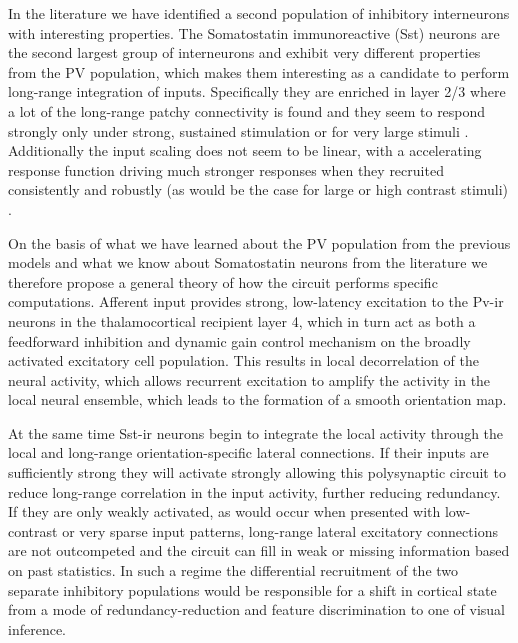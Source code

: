 In the literature we have identified a second population of inhibitory
interneurons with interesting properties. The Somatostatin
immunoreactive (Sst) neurons are the second largest group of
interneurons \citep{Gonchar2007,Xu2010} and exhibit very different
properties from the PV population, which makes them interesting as a
candidate to perform long-range integration of inputs. Specifically
they are enriched in layer 2/3 where a lot of the long-range patchy
connectivity is found and they seem to respond strongly only under
strong, sustained stimulation \citep{Ma2011} or for very large stimuli
\citep{Adesnik2012}. Additionally the input scaling does not seem to
be linear, with a accelerating response function driving much stronger
responses when they recruited consistently and robustly (as would be
the case for large or high contrast stimuli)
\citep{Beierlein2003,Bartley2008,Tan2008}.

On the basis of what we have learned about the PV population from the
previous models and what we know about Somatostatin neurons from the
literature we therefore propose a general theory of how the circuit
performs specific computations. Afferent input provides strong,
low-latency excitation to the Pv-ir neurons in the thalamocortical
recipient layer 4, which in turn act as both a feedforward inhibition
and dynamic gain control mechanism on the broadly activated excitatory
cell population. This results in local decorrelation of the neural
activity, which allows recurrent excitation to amplify the activity in
the local neural ensemble, which leads to the formation of a smooth
orientation map.

At the same time Sst-ir neurons begin to integrate the local activity
through the local and long-range orientation-specific lateral
connections. If their inputs are sufficiently strong they will
activate strongly allowing this polysynaptic circuit to reduce
long-range correlation in the input activity, further reducing
redundancy. If they are only weakly activated, as would occur when
presented with low-contrast or very sparse input patterns, long-range
lateral excitatory connections are not outcompeted and the circuit can
fill in weak or missing information based on past statistics. In such
a regime the differential recruitment of the two separate inhibitory
populations would be responsible for a shift in cortical state from a
mode of redundancy-reduction and feature discrimination to one of
visual inference.

